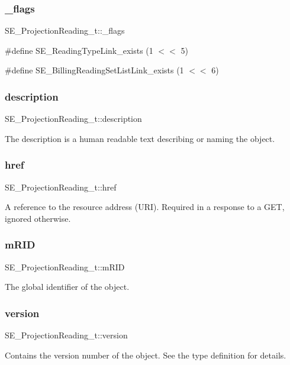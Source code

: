 \subsubsection{\texorpdfstring{\+\_\+flags}{\_flags}}
{\footnotesize\ttfamily S\+E\+\_\+\+Projection\+Reading\+\_\+t\+::\+\_\+flags}

\#define S\+E\+\_\+\+Reading\+Type\+Link\+\_\+exists (1 $<$$<$ 5)

\#define S\+E\+\_\+\+Billing\+Reading\+Set\+List\+Link\+\_\+exists (1 $<$$<$ 6) \mbox{\label{group__ProjectionReading_ga51e901325d458cbd9963ef99e10fbefe}} 
\subsubsection{\texorpdfstring{description}{description}}
{\footnotesize\ttfamily S\+E\+\_\+\+Projection\+Reading\+\_\+t\+::description}

The description is a human readable text describing or naming the object. \mbox{\label{group__ProjectionReading_ga2a1bf4a686ac027eb065f8a952f3f3c2}} 
\subsubsection{\texorpdfstring{href}{href}}
{\footnotesize\ttfamily S\+E\+\_\+\+Projection\+Reading\+\_\+t\+::href}

A reference to the resource address (U\+RI). Required in a response to a G\+ET, ignored otherwise. \mbox{\label{group__ProjectionReading_gacc942df214770665bc45618a06255c93}} 
\subsubsection{\texorpdfstring{m\+R\+ID}{mRID}}
{\footnotesize\ttfamily S\+E\+\_\+\+Projection\+Reading\+\_\+t\+::m\+R\+ID}

The global identifier of the object. \mbox{\label{group__ProjectionReading_ga5fdacfc135d427a7e68c07a75ad546d6}} 
\subsubsection{\texorpdfstring{version}{version}}
{\footnotesize\ttfamily S\+E\+\_\+\+Projection\+Reading\+\_\+t\+::version}

Contains the version number of the object. See the type definition for details. 